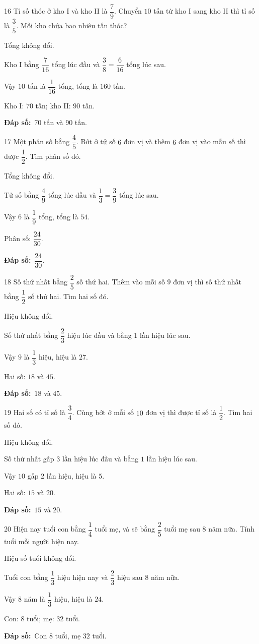 \documentclass[11pt]{article}
\newif\ifsol \solfalse
\providecommand{\AnsWord}{Đáp số}
\newcommand{\dapso}[1]{\par\textbf{\AnsWord:}\ #1}
\newcommand{\probsol}[1]{%
  \begin{lrbox}{\solmeasure}\begin{minipage}{\dimexpr\linewidth-24pt\relax}#1\end{minipage}\end{lrbox}%
  \ifsol
    \begin{solbox}#1\end{solbox}%
  \else
    \setlength{\solht}{\dimexpr\ht\solmeasure+\dp\solmeasure+0.85cm\relax}%
    \ifdim\solht<1.35cm\setlength{\solht}{1.35cm}\fi
    \begin{tcolorbox}[colback=white,colframe=Line,boxrule=0.8pt,arc=5pt,
      left=8pt,right=8pt,top=4pt,bottom=4pt,height=\solht]{\footnotesize\color{Slate}\itshape\WorkWord}\end{tcolorbox}%
  \fi}
\newcommand{\gap}{\vspace{0.3cm}}
\def\WorkWord{Bài làm:}
\def\AnsWord{Đáp số}
\begin{document}
\gap
\begin{probbox}{16}{\relax}
Tỉ số thóc ở kho I và kho II là $\dfrac79$. Chuyển $10$ tấn từ kho I sang kho II thì tỉ số là $\dfrac35$. Mỗi kho chứa bao nhiêu tấn thóc?
\end{probbox}
\probsol{
Tổng không đổi.\par Kho I bằng $\dfrac7{16}$ tổng lúc đầu và $\dfrac38=\dfrac6{16}$ tổng lúc sau.\par Vậy $10$ tấn là $\dfrac1{16}$ tổng, tổng là $160$ tấn.\par Kho I: $70$ tấn; kho II: $90$ tấn.
\dapso{$70$ tấn và $90$ tấn.}}
\gap
\begin{probbox}{17}{\relax}
Một phân số bằng $\dfrac45$. Bớt ở tử số $6$ đơn vị và thêm $6$ đơn vị vào mẫu số thì được $\dfrac12$. Tìm phân số đó.
\end{probbox}
\probsol{
Tổng không đổi.\par Tử số bằng $\dfrac49$ tổng lúc đầu và $\dfrac13=\dfrac39$ tổng lúc sau.\par Vậy $6$ là $\dfrac19$ tổng, tổng là $54$.\par Phân số: $\dfrac{24}{30}$.
\dapso{$\dfrac{24}{30}$.}}
\gap
\begin{probbox}{18}{\relax}
Số thứ nhất bằng $\dfrac25$ số thứ hai. Thêm vào mỗi số $9$ đơn vị thì số thứ nhất bằng $\dfrac12$ số thứ hai. Tìm hai số đó.
\end{probbox}
\probsol{
Hiệu không đổi.\par Số thứ nhất bằng $\dfrac23$ hiệu lúc đầu và bằng $1$ lần hiệu lúc sau.\par Vậy $9$ là $\dfrac13$ hiệu, hiệu là $27$.\par Hai số: $18$ và $45$.
\dapso{$18$ và $45$.}}
\gap
\begin{probbox}{19}{\relax}
Hai số có tỉ số là $\dfrac34$. Cùng bớt ở mỗi số $10$ đơn vị thì được tỉ số là $\dfrac12$. Tìm hai số đó.
\end{probbox}
\probsol{
Hiệu không đổi.\par Số thứ nhất gấp $3$ lần hiệu lúc đầu và bằng $1$ lần hiệu lúc sau.\par Vậy $10$ gấp $2$ lần hiệu, hiệu là $5$.\par Hai số: $15$ và $20$.
\dapso{$15$ và $20$.}}
\gap
\begin{probbox}{20}{\relax}
Hiện nay tuổi con bằng $\dfrac14$ tuổi mẹ, và sẽ bằng $\dfrac25$ tuổi mẹ sau $8$ năm nữa. Tính tuổi mỗi người hiện nay.
\end{probbox}
\probsol{
Hiệu số tuổi không đổi.\par Tuổi con bằng $\dfrac13$ hiệu hiện nay và $\dfrac23$ hiệu sau $8$ năm nữa.\par Vậy $8$ năm là $\dfrac13$ hiệu, hiệu là $24$.\par Con: $8$ tuổi; mẹ: $32$ tuổi.
\dapso{Con $8$ tuổi, mẹ $32$ tuổi.}}
\end{document}
